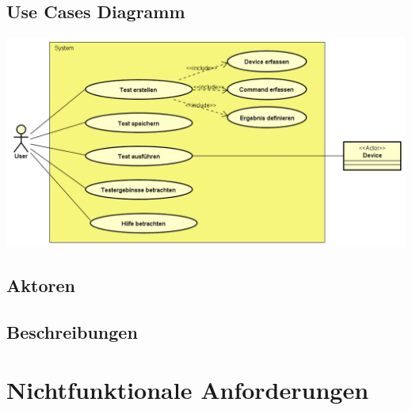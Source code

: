 \documentclass[a4,12pt]{scrartcl}
\begin{document}
\subsection{Use Cases Diagramm}
\includegraphics[scale=0.52]{figures/UseCase_Diagram}
\subsection{Aktoren}
\subsection{Beschreibungen}

\newpage
\section{Nichtfunktionale Anforderungen}
\end{document}
